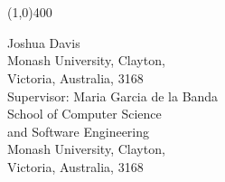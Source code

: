\begin{titlepage}
\vspace{10cm}
\scalebox{2}{\sffamily\huge Solving the Minimisation}\\
\vspace{10pt}
\scalebox{2}{\sffamily\huge of the Open Stacks} \\
\vspace{10pt}
\scalebox{2}{\sffamily\huge Problem}
\begin{figure}[h]
	\linethickness{10pt}
	\line(1,0){400}
\end{figure}

\vspace{10cm}

\begin{figure}[h]
	\begin{flushright}
		{\sf\Huge Joshua Davis}\\
		{\sf\Large Monash University, Clayton,\\Victoria, Australia, 3168}\\\vspace{12pt}
		{\sf\huge Supervisor: Maria Garcia de la Banda}\\
		{\sf\Large School of Computer Science\\and Software Engineering}\\\vspace{10pt}
		{\sf\Large Monash University, Clayton,\\Victoria, Australia, 3168}\\ \vspace{20pt}
		{\sf\large \DATE}\\ 
	\end{flushright}
\end{figure}
\end{titlepage}

